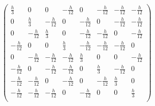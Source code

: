 \documentclass{article}
\begin{document}
\begin{doublespace}
\noindent\(\left(
\begin{array}{cccccccc}
 \frac{h}{3} & 0 & 0 & -\frac{h}{12} & 0 & -\frac{h}{12} & -\frac{h}{12} & -\frac{h}{12} \\
 0 & \frac{h}{3} & -\frac{h}{12} & 0 & -\frac{h}{12} & 0 & -\frac{h}{12} & -\frac{h}{12} \\
 0 & -\frac{h}{12} & \frac{h}{3} & 0 & -\frac{h}{12} & -\frac{h}{12} & 0 & -\frac{h}{12} \\
 -\frac{h}{12} & 0 & 0 & \frac{h}{3} & -\frac{h}{12} & -\frac{h}{12} & -\frac{h}{12} & 0 \\
 0 & -\frac{h}{12} & -\frac{h}{12} & -\frac{h}{12} & \frac{h}{3} & 0 & 0 & -\frac{h}{12} \\
 -\frac{h}{12} & 0 & -\frac{h}{12} & -\frac{h}{12} & 0 & \frac{h}{3} & -\frac{h}{12} & 0 \\
 -\frac{h}{12} & -\frac{h}{12} & 0 & -\frac{h}{12} & 0 & -\frac{h}{12} & \frac{h}{3} & 0 \\
 -\frac{h}{12} & -\frac{h}{12} & -\frac{h}{12} & 0 & -\frac{h}{12} & 0 & 0 & \frac{h}{3} \\
\end{array}
\right)\)
\end{doublespace}

\begin{doublespace}
\noindent\(\pmb{\text{}}\)
\end{doublespace}
\end{document}
